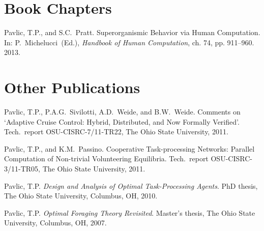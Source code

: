 \section{Book Chapters}

\begin{bibenum}
    \item Pavlic, T.P., and S.C.~Pratt.
        Superorganismic Behavior via Human Computation. In:
        P.~Michelucci~(Ed.), \emph{Handbook of Human Computation}, ch.
        74, pp. 911--960. 2013. 
\end{bibenum}

\section{Other Publications}

\begin{bibenum}
    \item Pavlic, T.P., P.A.G.~Sivilotti, A.D.~Weide, and B.W.~Weide.
        Comments on `Adaptive Cruise Control: Hybrid, Distributed, and
        Now Formally Verified'. Tech.~report OSU-CISRC-7/11-TR22, The Ohio State
        University, 2011.

    \item Pavlic, T.P., and K.M.~Passino. Cooperative Task-processing
        Networks: Parallel Computation of Non-trivial Volunteering
        Equilibria. Tech.~report OSU-CISRC-3/11-TR05, The Ohio State
        University, 2011.

    \item Pavlic, T.P. \emph{Design and Analysis of Optimal
        Task-Processing Agents}. PhD thesis, The Ohio State University,
        Columbus, OH, 2010.

    \item Pavlic, T.P. \emph{Optimal Foraging Theory Revisited}.
        Master's thesis, The Ohio State University, Columbus, OH, 2007.
\end{bibenum}